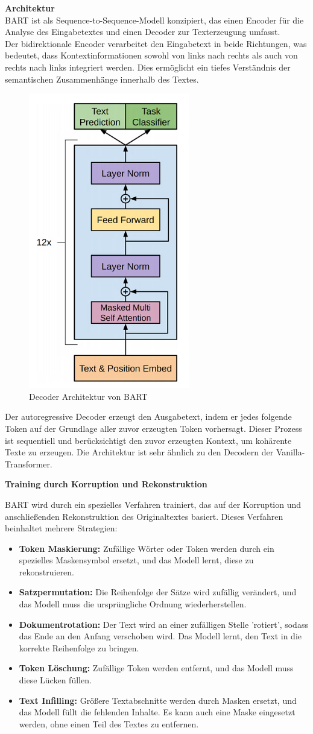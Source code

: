 \documentclass[12pt,a4paper,twoside]{article}
\begin{document}
\textbf{Architektur}\\
BART ist als Sequence-to-Sequence-Modell konzipiert, das einen Encoder für die Analyse des Eingabetextes und einen Decoder zur Texterzeugung umfasst.\\
Der bidirektionale Encoder verarbeitet den Eingabetext in beide Richtungen, was bedeutet, dass Kontextinformationen sowohl von links nach rechts als auch von rechts nach links integriert werden. Dies ermöglicht ein tiefes Verständnis der semantischen Zusammenhänge innerhalb des Textes.

\begin{figure}[H]
    \centering
    \includegraphics[width=0.2\linewidth]{BART-Decoder.png}
    \caption{Decoder Architektur von BART}
    \label{fig:enter-label}
\end{figure}

Der autoregressive Decoder erzeugt den Ausgabetext, indem er jedes folgende Token auf der Grundlage aller zuvor erzeugten Token vorhersagt. Dieser Prozess ist sequentiell und berücksichtigt den zuvor erzeugten Kontext, um kohärente Texte zu erzeugen. Die Architektur ist sehr ähnlich zu den Decodern der Vanilla-Transformer.


\textbf{Training durch Korruption und Rekonstruktion}

BART wird durch ein spezielles Verfahren trainiert, das auf der Korruption und anschließenden Rekonstruktion des Originaltextes basiert. Dieses Verfahren beinhaltet mehrere Strategien:

\begin{itemize}
    \item \textbf{Token Maskierung:} Zufällige Wörter oder Token werden durch ein spezielles Maskensymbol ersetzt, und das Modell lernt, diese zu rekonstruieren.
    \item \textbf{Satzpermutation:} Die Reihenfolge der Sätze wird zufällig verändert, und das Modell muss die ursprüngliche Ordnung wiederherstellen.
    \item \textbf{Dokumentrotation:} Der Text wird an einer zufälligen Stelle 'rotiert', sodass das Ende an den Anfang verschoben wird. Das Modell lernt, den Text in die korrekte Reihenfolge zu bringen.
    \item \textbf{Token Löschung:} Zufällige Token werden entfernt, und das Modell muss diese Lücken füllen.
    \item \textbf{Text Infilling:} Größere Textabschnitte werden durch Masken ersetzt, und das Modell füllt die fehlenden Inhalte. Es kann auch eine Maske eingesetzt werden, ohne einen Teil des Textes zu entfernen.
\end{itemize}
\end{document}
